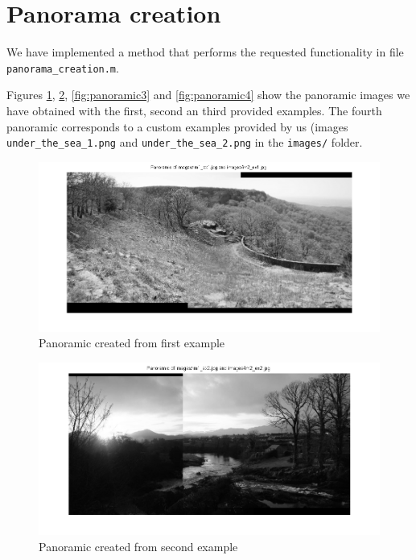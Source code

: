 \FloatBarrier
\section{Panorama creation}

We have implemented a method that performs the requested functionality in file
\texttt{panorama\_creation.m}.

Figures \ref{fig:panoramic1}, \ref{fig:panoramic2}, \ref{fig:panoramic3} and
\ref{fig:panoramic4} show the panoramic images we have obtained with the first,
second an third provided examples. The fourth panoramic corresponds to a
custom examples provided by us (images \texttt{under\_the\_sea\_1.png} and
\texttt{under\_the\_sea\_2.png} in the \texttt{images/} folder.

\begin{figure}[htb]
	\centering
		\includegraphics[width=\textwidth]{./img/ex2/panoramic1.png}
	\caption{Panoramic created from first example}
	\label{fig:panoramic1}
\end{figure}

\begin{figure}[htb]
	\centering
		\includegraphics[width=\textwidth]{./img/ex2/panoramic2.png}
	\caption{Panoramic created from second example}
	\label{fig:panoramic2}
\end{figure}

